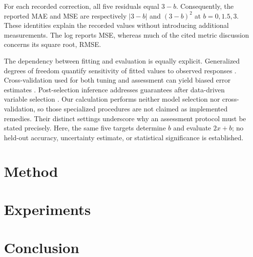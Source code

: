 \documentclass[11pt]{article}
\begin{document}
For each recorded correction, all five residuals equal $3-b$. Consequently, the reported MAE and MSE are respectively $|3-b|$ and $(3-b)^2$ at $b=0,1.5,3$. These identities explain the recorded values without introducing additional measurements. The log reports MSE, whereas much of the cited metric discussion concerns its square root, RMSE.

The dependency between fitting and evaluation is equally explicit. Generalized degrees of freedom quantify sensitivity of fitted values to observed responses \cite{Ye1998MeasuringCorrecting}. Cross-validation used for both tuning and assessment can yield biased error estimates \cite{Varma2006BiasError}. Post-selection inference addresses guarantees after data-driven variable selection \cite{Berk2013ValidPostselection}. Our calculation performs neither model selection nor cross-validation, so those specialized procedures are not claimed as implemented remedies. Their distinct settings underscore why an assessment protocol must be stated precisely. Here, the same five targets determine $b$ and evaluate $2x+b$; no held-out accuracy, uncertainty estimate, or statistical significance is established.

\section{Method}
\section{Experiments}
\section{Conclusion}


\end{document}
